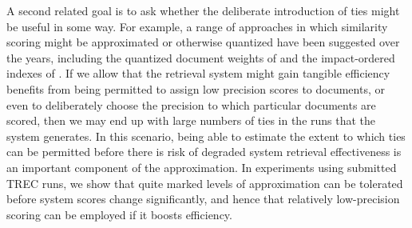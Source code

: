 A second related goal is to ask whether the deliberate introduction
of ties might be useful in some way.
For example, a range of approaches in which similarity scoring might
be approximated or otherwise quantized have been suggested over the
years, including the quantized document weights of {\citet{mzs94ipm}}
and the impact-ordered indexes of {\citet{am06sigir}}.
If we allow that the retrieval system might gain tangible efficiency
benefits from being permitted to assign low precision scores to
documents, or even to deliberately choose the precision to which
particular documents are scored, then we may end up with large
numbers of ties in the runs that the system generates.
In this scenario, being able to estimate the extent to which ties can
be permitted before there is risk of degraded system retrieval
effectiveness is an important component of the approximation.
In experiments using submitted TREC runs, we show that quite marked
levels of approximation can be tolerated before system scores change
significantly, and hence that relatively low-precision scoring can be
employed if it boosts efficiency.

